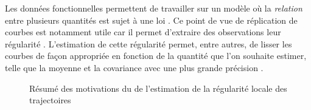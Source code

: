 Les données fonctionnelles permettent de travailler sur un modèle où la \emph{relation} entre plusieurs quantités est sujet à une loi . Ce point de vue de réplication de courbes est notamment utile car il permet d'extraire des observations leur régularité . L'estimation de cette régularité permet, entre autres, de lisser les courbes de façon appropriée en fonction de la quantité que l'on souhaite estimer, telle que la moyenne et la covariance avec une plus grande précision . 

\noindent\begin{figure}[H]
    \centering
    \caption{Résumé des motivations du de l'estimation de la régularité locale des trajectoires}
    \label{fig:sketch_resume_informel}
\end{figure}


\pagebreak